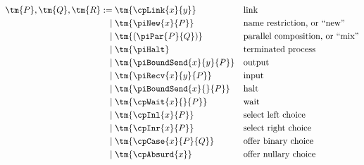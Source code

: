 \begin{definition}[Terms]\label{def:hccp-terms}
  \begin{gather*}
    \begin{aligned}
      \tm{P}, \tm{Q}, \tm{R}
           :=& \; \tm{\cpLink{x}{y}}         &&\text{link}
      \\ \mid& \; \tm{\piNew{x}{P}}          &&\text{name restriction, or ``new''}
      \\ \mid& \; \tm{( \piPar{P}{Q} )}      &&\text{parallel composition, or ``mix''}
      \\ \mid& \; \tm{\piHalt}               &&\text{terminated process}
      \\ \mid& \; \tm{\piBoundSend{x}{y}{P}} &&\text{output}
      \\ \mid& \; \tm{\piRecv{x}{y}{P}}      &&\text{input}
      \\ \mid& \; \tm{\piBoundSend{x}{}{P}}  &&\text{halt}
      \\ \mid& \; \tm{\cpWait{x}{}{P}}       &&\text{wait}
      \\ \mid& \; \tm{\cpInl{x}{P}}          &&\text{select left choice}
      \\ \mid& \; \tm{\cpInr{x}{P}}          &&\text{select right choice}
      \\ \mid& \; \tm{\cpCase{x}{P}{Q}}      &&\text{offer binary choice}
      \\ \mid& \; \tm{\cpAbsurd{x}}          &&\text{offer nullary choice}
    \end{aligned}
  \end{gather*}
\end{definition}
